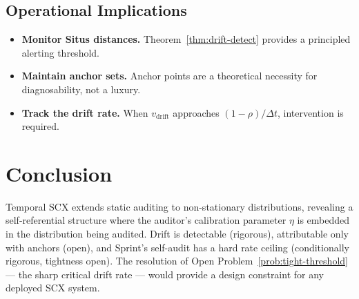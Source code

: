 \documentclass[12pt,a4paper]{article}
\begin{document}
\subsection{Operational Implications}

\begin{itemize}
    \item \textbf{Monitor Situs distances.} Theorem~\ref{thm:drift-detect}
          provides a principled alerting threshold.
    \item \textbf{Maintain anchor sets.} Anchor points are a theoretical
          necessity for diagnosability, not a luxury.
    \item \textbf{Track the drift rate.} When $v_{\mathrm{drift}}$ approaches
          $(1-\rho)/\Delta t$, intervention is required.
\end{itemize}

\section{Conclusion}

Temporal SCX extends static auditing to non-stationary distributions,
revealing a self-referential structure where the auditor's calibration
parameter $\eta$ is embedded in the distribution being audited.  Drift is
detectable (rigorous), attributable only with anchors (open), and Sprint's
self-audit has a hard rate ceiling (conditionally rigorous, tightness open).
The resolution of Open Problem~\ref{prob:tight-threshold} — the sharp
critical drift rate — would provide a design constraint for any deployed
SCX system.
\end{document}
